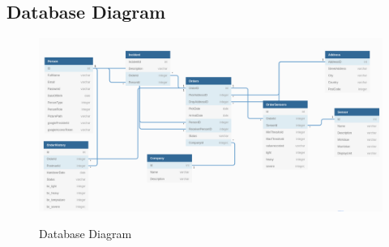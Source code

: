 \subsection{Database Diagram}
\begin{figure}[!ht]
	\centering
	\includegraphics[width=1\textwidth]{images/IOSLDBDiagramlatex.png}\\
	\caption{Database Diagram}
	\label{fig:Database Diagram}
\end{figure}
